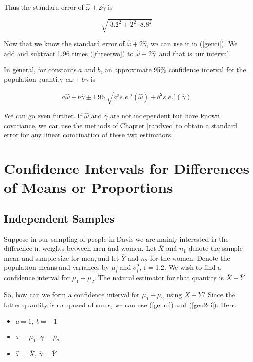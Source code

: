 Thus the standard error of $\hat{\omega} + 2 \hat{\gamma}$ is

\begin{equation}
\label{threetwo}
\sqrt{\cdot 3.2^2 + 2^2 \cdot 8.8^2}
\end{equation}

Now that we know the standard error of $\hat{\omega} + 2 \hat{\gamma}$,
we can use it in (\ref{genci}).  We add and subtract 1.96 times
(\ref{threetwo}) to $\hat{\omega} + 2 \hat{\gamma}$, and that is our
interval.

In general, for constants $a$ and $b$, an approximate 95\% confidence
interval for the population quantity $a \omega + b \gamma$ is

\begin{equation}
\label{gen2ci}
a \hat{\omega} + b \hat{\gamma} \pm 1.96 ~
\sqrt{a^2 s.e.^2(\hat{\omega}) +
      b^2 s.e.^2(\hat{\gamma})
}
\end{equation}

We can go even further.  If $\hat{\omega}$ and $\hat{\gamma}$ are not
independent but have known covariance, we can use the methods of Chapter
\ref{randvec} to obtain a standard error for any linear combination of
these two estimators.

\section{Confidence Intervals for Differences of Means or Proportions}
\label{diffs}

\subsection{Independent Samples}
\label{indepsams}

Suppose in our sampling of people in Davis we are mainly interested in
the difference in weights between men and women.  Let $\overline{X}$ and
$n_1$ denote the sample mean and sample size for men, and let $\overline{Y}$
and $n_2$ for the women.  Denote the population means and variances by
$\mu_i$ and $\sigma_i^2$, i = 1,2.  We wish to find a confidence
interval for $\mu_1 - \mu_2$.  The natural estimator for that quantity
is $\overline{X} - \overline{Y}$.  

So, how can we form a confidence interval for $\mu_1 - \mu_2$ using
$\overline{X} - \overline{Y}$?  Since the latter quantity is composed of
sums, we can use (\ref{genci}) and (\ref{gen2ci}).  Here:

\begin{itemize}

\item $a = 1, ~ b = -1$

\item $\omega = \mu_1, ~ \gamma = \mu_2$

\item $\hat{\omega} = \overline{X}, ~
       \hat{\gamma} = \overline{Y}$

\end{itemize}

